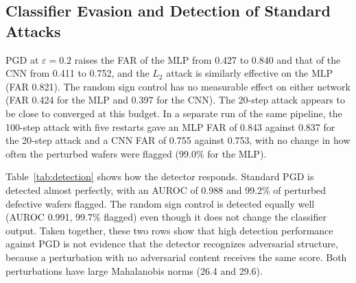 \documentclass[preprint,12pt,authoryear]{elsarticle}
\begin{document}
\subsection{Classifier Evasion and Detection of Standard Attacks}
PGD at $\varepsilon=0.2$ raises the FAR of the MLP from 0.427 to 0.840 and that of the CNN from 0.411 to 0.752, and the $L_2$ attack is similarly effective on the MLP (FAR 0.821). The random sign control has no measurable effect on either network (FAR 0.424 for the MLP and 0.397 for the CNN). The 20-step attack appears to be close to converged at this budget. In a separate run of the same pipeline, the 100-step attack with five restarts gave an MLP FAR of 0.843 against 0.837 for the 20-step attack and a CNN FAR of 0.755 against 0.753, with no change in how often the perturbed wafers were flagged (99.0\% for the MLP).

Table~\ref{tab:detection} shows how the detector responds. Standard PGD is detected almost perfectly, with an AUROC of 0.988 and 99.2\% of perturbed defective wafers flagged. The random sign control is detected equally well (AUROC 0.991, 99.7\% flagged) even though it does not change the classifier output. Taken together, these two rows show that high detection performance against PGD is not evidence that the detector recognizes adversarial structure, because a perturbation with no adversarial content receives the same score. Both perturbations have large Mahalanobis norms (26.4 and 29.6).
\end{document}
